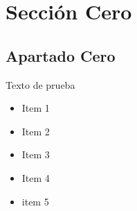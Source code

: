 \section{Sección Cero}
\subsection{Apartado Cero}
\begin{large}
Texto de prueba

\begin{itemize}
   \item Item 1
   \item Item 2
   \item Item 3
   \item Item 4
   \item item 5
\end{itemize}
\end{large}